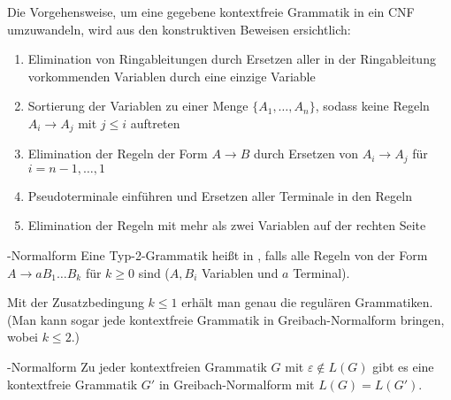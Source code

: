 \begin{Bem}
    Die Vorgehensweise, um eine gegebene kontextfreie Grammatik in ein
    CNF umzuwandeln, wird aus den konstruktiven Beweisen ersichtlich:
    \begin{enumerate}
        \item
        Elimination von Ringableitungen durch Ersetzen aller in der
        Ringableitung vorkommenden Variablen durch eine einzige Variable
        
        \item
        Sortierung der Variablen zu einer Menge $\{A_1, \dotsc, A_n\}$,
        sodass keine Regeln $A_i \rightarrow A_j$ mit $j \le i$ auftreten
        
        \item
        Elimination der Regeln der Form $A \rightarrow B$
        durch Ersetzen von $A_i \rightarrow A_j$ für $i = n - 1, \dotsc, 1$
        
        \item
        Pseudoterminale einführen und Ersetzen aller Terminale in den Regeln
        
        \item
        Elimination der 
        Regeln mit mehr als zwei Variablen auf der rechten Seite
    \end{enumerate}
\end{Bem}

\linie

\begin{Def}{-Normalform}
    Eine Typ-2-Grammatik heißt in , falls
    alle Regeln von der Form $A \rightarrow a B_1 \dotsc B_k$ für $k \ge 0$
    sind ($A, B_i$ Variablen und $a$ Terminal).
\end{Def}

\begin{Bem}
    Mit der Zusatzbedingung $k \le 1$ erhält man genau die regulären
    Grammatiken.\\
    (Man kann sogar jede kontextfreie Grammatik in Greibach-Normalform bringen,
    wobei $k \le 2$.)
\end{Bem}

\begin{Satz}{-Normalform}
    Zu jeder kontextfreien Grammatik $G$ mit $\varepsilon \notin L(G)$ gibt
    es eine kontextfreie Grammatik $G'$ in Greibach-Normalform mit
    $L(G) = L(G')$.
\end{Satz}

